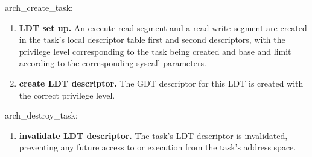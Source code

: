 \documentclass[11pt, letterpaper, twoside, english]{book}
\begin{document}
\textsf{arch\_create\_task}: 
\begin{enumerate}
\item[]\textbf{LDT set up.} An execute-read segment and a read-write segment are created in the task's local descriptor table first and second descriptors, with the privilege level corresponding to the task being created and base and limit according to the corresponding syscall parameters.
\item[]\textbf{create LDT descriptor.} The GDT descriptor for this LDT is created with the correct privilege level.
\end{enumerate}

\textsf{arch\_destroy\_task}: 
\begin{enumerate}
\item[]\textbf{invalidate LDT descriptor.} The task's LDT descriptor is invalidated, preventing any future access to or execution from the task's address space.
\end{enumerate}
\end{document}
